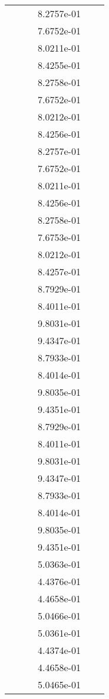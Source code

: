 \begin{xltabular}{\textwidth}{r|rS[table-format=1.3e+2]S[table-format=1.4e+2]S[table-format=1.4e+2]S[table-format=-1.5]}
&  &  & 8.2757e-01 & & \\
&  &  & 7.6752e-01 & & \\
&  &  & 8.0211e-01 & & \\
&  &  & 8.4255e-01 & & \\
&  &  & 8.2758e-01 & & \\
&  &  & 7.6752e-01 & & \\
&  &  & 8.0212e-01 & & \\
&  &  & 8.4256e-01 & & \\
&  &  & 8.2757e-01 & & \\
&  &  & 7.6752e-01 & & \\
&  &  & 8.0211e-01 & & \\
&  &  & 8.4256e-01 & & \\
&  &  & 8.2758e-01 & & \\
&  &  & 7.6753e-01 & & \\
&  &  & 8.0212e-01 & & \\
&  &  & 8.4257e-01 & & \\
&  &  & 8.7929e-01 & & \\
&  &  & 8.4011e-01 & & \\
&  &  & 9.8031e-01 & & \\
&  &  & 9.4347e-01 & & \\
&  &  & 8.7933e-01 & & \\
&  &  & 8.4014e-01 & & \\
&  &  & 9.8035e-01 & & \\
&  &  & 9.4351e-01 & & \\
&  &  & 8.7929e-01 & & \\
&  &  & 8.4011e-01 & & \\
&  &  & 9.8031e-01 & & \\
&  &  & 9.4347e-01 & & \\
&  &  & 8.7933e-01 & & \\
&  &  & 8.4014e-01 & & \\
&  &  & 9.8035e-01 & & \\
&  &  & 9.4351e-01 & & \\
&  &  & 5.0363e-01 & & \\
&  &  & 4.4376e-01 & & \\
&  &  & 4.4658e-01 & & \\
&  &  & 5.0466e-01 & & \\
&  &  & 5.0361e-01 & & \\
&  &  & 4.4374e-01 & & \\
&  &  & 4.4658e-01 & & \\
&  &  & 5.0465e-01 & & \\

\end{xltabular}
